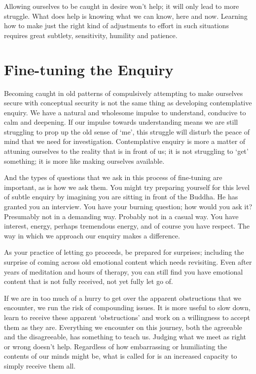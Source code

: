 Allowing ourselves to be caught in desire won’t help; it will only lead
to more struggle. What does help is knowing what we can know, here and
now. Learning how to make just the right kind of adjustments to effort
in such situations requires great subtlety, sensitivity, humility and
patience.

\section{Fine-tuning the Enquiry}

Becoming caught in old patterns of compulsively attempting to make
ourselves secure with conceptual security is not the same thing as
developing contemplative enquiry. We have a natural and wholesome
impulse to understand, conducive to calm and deepening. If our impulse
towards understanding means we are still struggling to prop up the old
sense of ‘me’, this struggle will disturb the peace of mind that we need
for investigation. Contemplative enquiry is more a matter of attuning
ourselves to the reality that is in front of us; it is not struggling to
‘get’ something; it is more like making ourselves available.

And the types of questions that we ask in this process of fine-tuning
are important, as is how we ask them. You might try preparing yourself
for this level of subtle enquiry by imagining you are sitting in front
of the Buddha. He has granted you an interview. You have your burning
question; how would you ask it? Presumably not in a demanding way.
Probably not in a casual way. You have interest, energy, perhaps
tremendous energy, and of course you have respect. The way in which we
approach our enquiry makes a difference.

As your practice of letting go proceeds, be prepared for surprises;
including the surprise of coming across old emotional content which
needs revisiting. Even after years of meditation and hours of therapy,
you can still find you have emotional content that is not fully
received, not yet fully let go of.

If we are in too much of a hurry to get over the apparent obstructions
that we encounter, we run the risk of compounding issues. It is more
useful to slow down, learn to receive these apparent ‘obstructions’ and
work on a willingness to accept them as they are. Everything we
encounter on this journey, both the agreeable and the disagreeable, has
something to teach us. Judging what we meet as right or wrong doesn’t
help. Regardless of how embarrassing or humiliating the contents of our
minds might be, what is called for is an increased capacity to simply
receive them all.

